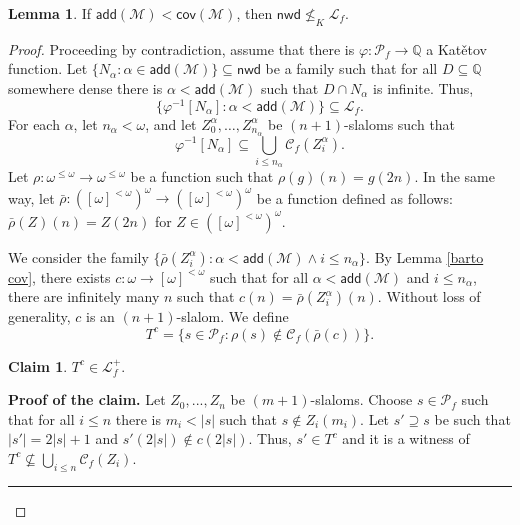 \documentclass{amsart}
\theoremstyle{definition}
\newtheorem{claim}[theorem]{Claim}
\newtheorem{lemma}[theorem]{Lemma}
\theoremstyle{remark}
\numberwithin{equation}{section}
\newcommand{\nwd}{\mathsf{nwd}}
\newcommand{\add}{\mathsf{add}}
\newcommand{\cov}{\mathsf{cov}}
\newcommand{\lf}{\mathcal{L}_f}
\newenvironment{proofclaim}[1][Proof of the claim]{\textbf{#1.} }{\hfill \rule{0.5em}{0.5em}}
\begin{document}
\begin{lemma}\label{a<c}
    If $\add(\mathcal{M})<\cov(\mathcal{M})$, then $\nwd\not \leq_K \lf$. 
\end{lemma}
\begin{proof}
        Proceeding by contradiction, assume that there is $\varphi:\mathcal{P}_f\rightarrow \mathbb{Q}$ a Kat\v{e}tov function. Let $\{N_\alpha:\alpha\in \add{(\mathcal{M})}\}\subseteq\nwd$ be a  family such that for all $D\subseteq \mathbb{Q}$ somewhere dense there is $\alpha<\add{(\mathcal{M})}$ such that $D\cap N_\alpha$ is infinite. Thus,
    \begin{displaymath}
        \{\varphi^{-1}[N_\alpha]:\alpha<\add{(\mathcal{M})}\} \subseteq \lf.
    \end{displaymath}
    For each $\alpha$, let $n_\alpha<\omega$, and let $Z_0^\alpha, \dots, Z_{n_\alpha}^\alpha$ be $(n+1)$-slaloms such that
    \begin{displaymath}
        \varphi^{-1}[N_\alpha] \subseteq \bigcup_{i\leq n_\alpha} \mathcal{C}_f(Z_i^\alpha).
    \end{displaymath}
    Let $\rho:\omega^{\leq \omega}\rightarrow\omega^{\leq \omega}$ be a function such that $\rho(g)(n)=g(2n)$. In the same way, let $\bar\rho: ([\omega]^{<\omega})^\omega \rightarrow ([\omega]^{<\omega})^\omega$ be a function defined as follows: $\bar\rho(Z)(n)=Z(2n)$ for  $Z\in([\omega]^{<\omega})^\omega$.


    We consider the family $\{\bar \rho(Z^\alpha_i):\alpha<\add(\mathcal{M})\wedge i\leq n_\alpha\}$. By Lemma \ref{barto cov}, there exists $c:\omega\rightarrow [\omega]^{<\omega}$ such that for all $\alpha<\add(\mathcal{M})$ and $i\leq n_\alpha$, there are infinitely many $n$ such that $c(n)=\bar\rho(Z^\alpha_i)(n)$. Without loss of generality, $c$ is an $(n+1)$-slalom. We define 
    \begin{displaymath}
        T^{c}=\{s\in \mathcal{P}_f: \rho(s)\notin \mathcal{C}_f(\bar\rho(c)) \}.
    \end{displaymath}

    \begin{claim}
        $T^c\in \lf^+$.
    \end{claim}
    \begin{proofclaim}
        Let $Z_0,...,Z_n$ be $(m+1)$-slaloms. Choose $s\in\mathcal{P}_f$ such that for all $i\leq n$ there is $m_i<|s|$ such that $s\notin Z_i(m_i)$. Let $s'\supseteq s$ be such that $|s'|=2|s|+1$ and $s'(2|s|)\not\in c(2|s|)$. Thus, $s'\in T^c$ and it is a witness of $T^c\not\subseteq\bigcup_{i\leq n}\mathcal{C}_f(Z_i)$.
    \end{proofclaim}


\end{proof}
\end{document}
